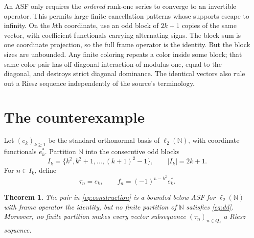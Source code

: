 \documentclass[11pt]{article}
\newtheorem{theorem}{Theorem}
\newcommand{\N}{\mathbb N}
\newcommand{\ellTwo}{\ell_2(\N)}
\begin{document}
An ASF only requires the \emph{ordered} rank-one series to converge to an
invertible operator. This permits large finite cancellation patterns whose
supports escape to infinity. On the $k$th coordinate, use an odd block of
$2k+1$ copies of the same vector, with coefficient functionals carrying
alternating signs. The block sum is one coordinate projection, so the full
frame operator is the identity. But the block sizes are unbounded. Any finite
coloring repeats a color inside some block; that same-color pair has
off-diagonal interaction of modulus one, equal to the diagonal, and destroys
strict diagonal dominance. The identical vectors also rule out a Riesz
sequence independently of the source's terminology.

\section{The counterexample}

Let $(e_k)_{k\ge1}$ be the standard orthonormal basis of $\ellTwo$, with
coordinate functionals $e_k^*$. Partition $\N$ into the consecutive odd
blocks
\[
 I_k=\{k^2,k^2+1,\ldots,(k+1)^2-1\},\qquad |I_k|=2k+1.
\]
For $n\in I_k$, define
\begin{equation}\label{eq:construction}
 \tau_n=e_k,
 \qquad
 f_n=(-1)^{n-k^2}e_k^*.
\end{equation}

\begin{theorem}\label{thm:main}
The pair in \eqref{eq:construction} is a bounded-below ASF for $\ellTwo$ with
frame operator the identity, but no finite partition of $\N$ satisfies
\eqref{eq:dd}. Moreover, no finite partition makes every vector subsequence
$(\tau_n)_{n\in Q_j}$ a Riesz sequence.
\end{theorem}
\end{document}
